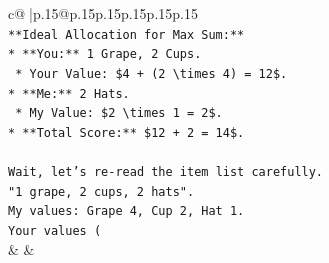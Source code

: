\documentclass{article}
\begin{document}
{\begin{supertabular}{c@{$\;$}|p{.15\linewidth}@{}p{.15\linewidth}p{.15\linewidth}p{.15\linewidth}p{.15\linewidth}p{.15\linewidth}}
{{{\\ 
\texttt{**Ideal Allocation for Max Sum:**} \\
\texttt{*   **You:** 1 Grape, 2 Cups.} \\
\texttt{    *   Your Value: \$4 + (2 \textbackslash{}times 4) = 12\$.} \\
\texttt{*   **Me:** 2 Hats.} \\
\texttt{    *   My Value: \$2 \textbackslash{}times 1 = 2\$.} \\
\texttt{*   **Total Score:** \$12 + 2 = 14\$.} \\
\\ 
\texttt{Wait, let's re{-}read the item list carefully.} \\
\texttt{"1 grape, 2 cups, 2 hats".} \\
\texttt{My values: Grape 4, Cup 2, Hat 1.} \\
\texttt{Your values (} \\
            }
        }
    }
    & & \\ \\


\end{supertabular}}
\end{document}
